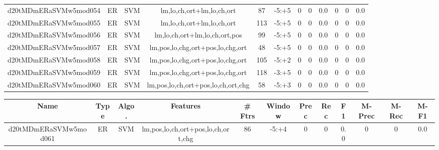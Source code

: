 \documentclass[a4paper]{article}
\begin{document}
\begin{landscape}
\begin{center}
\begin{tabular}{ |c|c|c|c|c|c|c|c|c|c|c|c|}
 
 	
 	\small{ d20tMDmERaSVMw5mod054 } & ER & SVM & lm,lo,ch,ort+lm,lo,ch,ort  &  87 &  -5:+5  &  0 & 0 & 0.0  &  0 & 0 & 0.0 \\
 	

 
 	
 	\small{ d20tMDmERaSVMw5mod055 } & ER & SVM & lm,lo,ch,ort+lm,lo,ch,ort  &  113 &  -5:+5  &  0 & 0 & 0.0  &  0 & 0 & 0.0 \\
 	

 
 	
 	\small{ d20tMDmERaSVMw5mod056 } & ER & SVM & lm,lo,ch,ort+lm,lo,ch,ort,pos  &  99 &  -5:+5  &  0 & 0 & 0.0  &  0 & 0 & 0.0 \\
 	

 
 	
 	\small{ d20tMDmERaSVMw5mod057 } & ER & SVM & lm,pos,lo,chg,ort+pos,lo,chg,ort  &  48 &  -5:+5  &  0 & 0 & 0.0  &  0 & 0 & 0.0 \\
 	

 
 	
 	\small{ d20tMDmERaSVMw5mod058 } & ER & SVM & lm,pos,lo,chg,ort+pos,lo,chg,ort  &  105 &  -5:+2  &  0 & 0 & 0.0  &  0 & 0 & 0.0 \\
 	

 
 	
 	\small{ d20tMDmERaSVMw5mod059 } & ER & SVM & lm,pos,lo,chg,ort+pos,lo,chg,ort  &  118 &  -3:+5  &  0 & 0 & 0.0  &  0 & 0 & 0.0 \\
 	

 
 	
 	\small{ d20tMDmERaSVMw5mod060 } & ER & SVM & lm,pos,lo,ch,ort+pos,lo,ch,ort,chg  &  58 &  -5:+3  &  0 & 0 & 0.0  &  0 & 0 & 0.0 \\
 	
 \hline
\end{tabular}
\end{center}




\begin{center}
\begin{tabular}{ |c|c|c|c|c|c|c|c|c|c|c|c|} 
 \hline
 	Name & Type & Algo. & Features & \# Ftrs & Window & Prec & Rec & F1 & M-Prec & M-Rec & M-F1\\
 \hline

 	

 
 	
 	\small{ d20tMDmERaSVMw5mod061 } & ER & SVM & lm,pos,lo,ch,ort+pos,lo,ch,ort,chg  &  86 &  -5:+4  &  0 & 0 & 0.0  &  0 & 0 & 0.0 \\
 	


\end{tabular}
\end{center}
\end{landscape}
\end{document}
